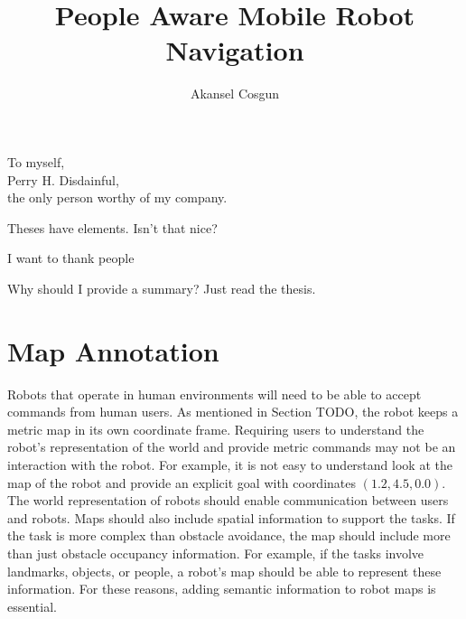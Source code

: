 \documentclass[12pt]{gatech-thesis}
\title{People Aware Mobile Robot Navigation} %
\author{Akansel Cosgun}
\begin{document}
%

\begin{preliminary}
\begin{dedication}
\null\vfil
{\large
\begin{center}
To myself,\\\vspace{12pt}
Perry H. Disdainful,\\\vspace{12pt}
the only person worthy of my company.
\end{center}}
\vfil\null
\end{dedication}
\begin{preface}
Theses have elements.  Isn't that nice?
\end{preface}
\begin{acknowledgements}
I want to thank people
\end{acknowledgements}
\contents
\begin{summary}
Why should I provide a summary?  Just read the thesis.
\end{summary}
\end{preliminary}



%



\chapter{Map Annotation}
\label{chapter:map_annotation}

Robots that operate in human environments will need to be able to accept commands from human users. As mentioned in Section TODO, the robot keeps a metric map in its own coordinate frame. Requiring users to understand the robot's representation of the world and provide metric commands may not be an interaction with the robot. For example, it is not easy to understand look at the map of the robot and provide an explicit  goal with coordinates $(1.2,4.5,0.0)$. The world representation of robots should enable communication between users and robots. Maps should also include spatial information to support the tasks. If the task is more complex than obstacle avoidance, the map should include more than just obstacle occupancy information. For example, if the tasks involve landmarks, objects, or people, a robot's map should be able to represent these information. For these reasons, adding semantic information to robot maps is essential.
\end{document}
